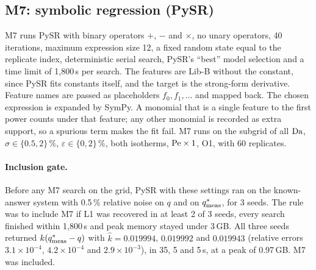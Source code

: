\subsection*{M7: symbolic regression (PySR)}
M7 runs PySR with binary operators $+$, $-$ and $\times$, no unary operators, 40 iterations,
maximum expression size 12, a fixed random state equal to the replicate index, deterministic
serial search, PySR's ``best'' model selection and a time limit of 1,800\,s per search. The
features are Lib-B without the constant, since PySR fits constants itself, and the target is
the strong-form derivative. Feature names are passed as placeholders $f_0, f_1, \dots$ and
mapped back. The chosen expression is expanded by SymPy. A monomial that is a single feature
to the first power counts under that feature; any other monomial is recorded as extra
support, so a spurious term makes the fit fail. M7 runs on the subgrid of all $\mathrm{Da}$,
$\sigma \in \{0.5, 2\}\,\%$, $\varepsilon \in \{0, 2\}\,\%$, both isotherms, $\mathrm{Pe} \times 1$,
O1, with 60 replicates.

\paragraph{Inclusion gate.} Before any M7 search on the grid, PySR with these settings ran on
the known-answer system with 0.5\,\% relative noise on $q$ and on $q^{*}_{\mathrm{meas}}$, for 3 seeds. The
rule was to include M7 if L1 was recovered in at least 2 of 3 seeds, every search finished
within 1,800\,s and peak memory stayed under 3\,GB. All three seeds returned $k(q^{*}_{\mathrm{meas}} - q)$ with
$\hat k = 0.019994$, $0.019992$ and $0.019943$ (relative errors $3.1\times10^{-4}$,
$4.2\times10^{-4}$ and $2.9\times10^{-3}$), in 35, 5 and 5\,s, at a peak of 0.97\,GB. M7 was
included.

